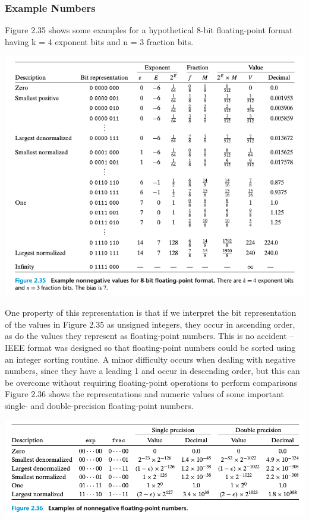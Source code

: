 \documentclass[11pt]{article}
\begin{document}
\subsubsection{Example Numbers}
\label{sec:org4f0170b}
Figure 2.35 shows some examples for a hypothetical 8-bit floating-point format having k = 4 exponent bits and n = 3 fraction bits.\\

\begin{center}
\includegraphics[width=.9\linewidth]{pics/floating-point-example.png}
\end{center}

One property of this representation is that if we interpret the bit representation of the values in Figure 2.35 as unsigned integers, they occur in ascending order, as do the values they represent as floating-point numbers. This is no accident -- IEEE format was designed so that floating-point numbers could be sorted using an integer sorting routine. A minor difficulty occurs when dealing with negative numbers, since they have a leading 1 and occur in descending order, but this can be overcome without requiring floating-point operations to perform comparisons\\

Figure 2.36 shows the representations and numeric values of some important single- and double-precision floating-point numbers.\\

\begin{center}
\includegraphics[width=.9\linewidth]{pics/example-of-nonnegative-floating-point-numbers.png}
\end{center}
\end{document}
